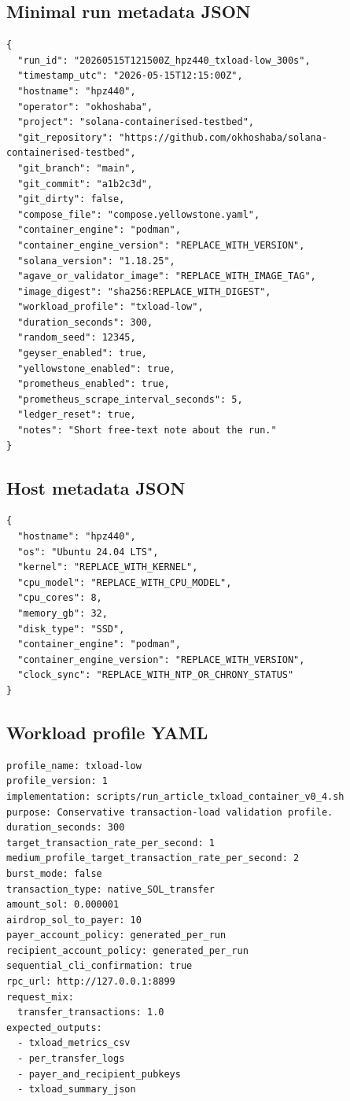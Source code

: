 \documentclass[11pt,a4paper]{article}
\begin{document}
\subsection{Minimal run metadata JSON}
\label{app:minimal-run-json}

\begin{verbatim}
{
  "run_id": "20260515T121500Z_hpz440_txload-low_300s",
  "timestamp_utc": "2026-05-15T12:15:00Z",
  "hostname": "hpz440",
  "operator": "okhoshaba",
  "project": "solana-containerised-testbed",
  "git_repository": "https://github.com/okhoshaba/solana-containerised-testbed",
  "git_branch": "main",
  "git_commit": "a1b2c3d",
  "git_dirty": false,
  "compose_file": "compose.yellowstone.yaml",
  "container_engine": "podman",
  "container_engine_version": "REPLACE_WITH_VERSION",
  "solana_version": "1.18.25",
  "agave_or_validator_image": "REPLACE_WITH_IMAGE_TAG",
  "image_digest": "sha256:REPLACE_WITH_DIGEST",
  "workload_profile": "txload-low",
  "duration_seconds": 300,
  "random_seed": 12345,
  "geyser_enabled": true,
  "yellowstone_enabled": true,
  "prometheus_enabled": true,
  "prometheus_scrape_interval_seconds": 5,
  "ledger_reset": true,
  "notes": "Short free-text note about the run."
}
\end{verbatim}

\subsection{Host metadata JSON}
\label{app:host-json}

\begin{verbatim}
{
  "hostname": "hpz440",
  "os": "Ubuntu 24.04 LTS",
  "kernel": "REPLACE_WITH_KERNEL",
  "cpu_model": "REPLACE_WITH_CPU_MODEL",
  "cpu_cores": 8,
  "memory_gb": 32,
  "disk_type": "SSD",
  "container_engine": "podman",
  "container_engine_version": "REPLACE_WITH_VERSION",
  "clock_sync": "REPLACE_WITH_NTP_OR_CHRONY_STATUS"
}
\end{verbatim}

\subsection{Workload profile YAML}
\label{app:workload-yaml}

\begin{verbatim}
profile_name: txload-low
profile_version: 1
implementation: scripts/run_article_txload_container_v0_4.sh
purpose: Conservative transaction-load validation profile.
duration_seconds: 300
target_transaction_rate_per_second: 1
medium_profile_target_transaction_rate_per_second: 2
burst_mode: false
transaction_type: native_SOL_transfer
amount_sol: 0.000001
airdrop_sol_to_payer: 10
payer_account_policy: generated_per_run
recipient_account_policy: generated_per_run
sequential_cli_confirmation: true
rpc_url: http://127.0.0.1:8899
request_mix:
  transfer_transactions: 1.0
expected_outputs:
  - txload_metrics_csv
  - per_transfer_logs
  - payer_and_recipient_pubkeys
  - txload_summary_json
\end{verbatim}
\end{document}
